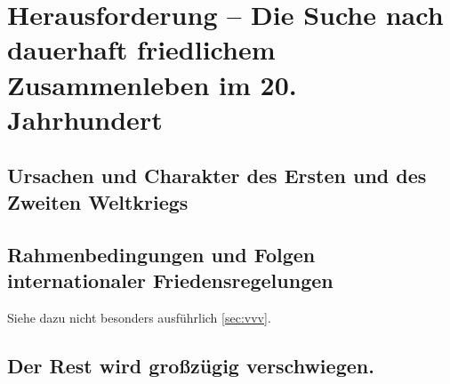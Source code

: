 \part{Herausforderung  – Die Suche nach dauerhaft
friedlichem Zusammenleben im 20. Jahrhundert}
\label{prt:herausf-frieden}

\chapter{Ursachen und Charakter des Ersten und des Zweiten Weltkriegs}










\chapter{Rahmenbedingungen und Folgen internationaler
Friedensregelungen}

Siehe dazu nicht besonders ausführlich \ref{sec:vvv}.

\chapter{Der Rest wird großzügig verschwiegen.}

\endinput
